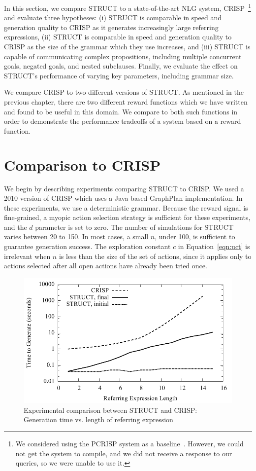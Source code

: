 In this section, we compare STRUCT to a state-of-the-art NLG system,
CRISP~\footnote{We considered using the PCRISP system as a
  baseline~\cite{bauer_sentence_2010}. However, we could not get the system to
  compile, and we did not receive a response to our queries, so we were
  unable to use it.}
and evaluate three hypotheses: (i) STRUCT is
comparable in speed and generation quality to CRISP as it generates
increasingly large referring expressions, (ii) STRUCT is
comparable in speed and generation quality to CRISP as the size of the
grammar which they use increases, and (iii) STRUCT is capable of
communicating complex propositions, including multiple concurrent
goals, negated goals, and nested subclauses.
Finally, we evaluate the effect on STRUCT's performance 
of varying key parameters, including grammar size.

We compare CRISP to two different versions of STRUCT.
As mentioned in the previous chapter, there are two different reward
functions which we have written and found to be useful in this
domain.  We compare to both such functions in order to demonstrate
the performance tradeoffs of a system based on a reward function.

\section{Comparison to CRISP}

We begin by describing experiments comparing STRUCT to CRISP. We used a
2010 version of CRISP  which uses a Java-based GraphPlan
implementation. In these
experiments, we use a deterministic grammar.
Because the reward signal is fine-grained,
 a myopic action selection strategy is
sufficient for these experiments, and 
the $d$ parameter is set to zero. The
number of simulations for STRUCT varies between 20 to 150.
In most cases, a small $n$, under 100, is sufficient
to guarantee generation success.  The exploration constant $c$ in
Equation~\ref{eqn:uct} is irrelevant when $n$ is less than the size
of the set of actions, since it
applies only to actions selected after all open actions have already
been tried once.

\begin{figure}
\centering
\includegraphics[width=0.7 \linewidth ]{../analysis/plots/complex-goal/complex-goal.pdf}
\caption{Experimental comparison between STRUCT and  CRISP: 
Generation time vs. length of referring expression }
\label{crisp-comparison-gentime}
\end{figure}

